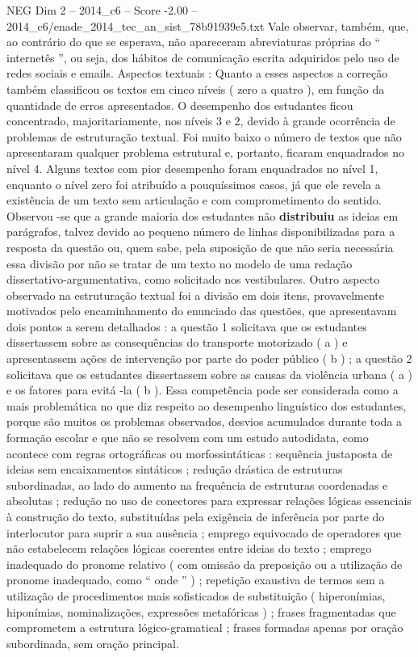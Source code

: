 \begin{textsample}{NEG Dim 2 – 2014\_c6 – Score -2.00 – 2014\_c6/enade\_2014\_tec\_an\_sist\_78b91939e5.txt}
Vale observar, também, que, ao contrário do que se esperava, não apareceram abreviaturas próprias do “ internetês ”, ou seja, dos hábitos de comunicação escrita adquiridos pelo uso de redes sociais e emails.
Aspectos textuais : Quanto a esses aspectos a correção também classificou os textos em cinco níveis ( zero a quatro ), em função da quantidade de erros apresentados.
O desempenho dos estudantes ficou concentrado, majoritariamente, nos níveis 3 e 2, devido à grande ocorrência de problemas de estruturação textual.
Foi muito baixo o número de textos que não apresentaram qualquer problema estrutural e, portanto, ficaram enquadrados no nível 4.
Alguns textos com pior desempenho foram enquadrados no nível 1, enquanto o nível zero foi atribuído a pouquíssimos casos, já que ele revela a existência de um texto sem articulação e com comprometimento do sentido.
Observou -se que a grande maioria dos estudantes não \textbf{distribuiu} as ideias em parágrafos, talvez devido ao pequeno número de linhas disponibilizadas para a resposta da questão ou, quem sabe, pela suposição de que não seria necessária essa divisão por não se tratar de um texto no modelo de uma redação dissertativo-argumentativa, como solicitado nos vestibulares.
Outro aspecto observado na estruturação textual foi a divisão em dois itens, provavelmente motivados pelo encaminhamento do enunciado das questões, que apresentavam dois pontos a serem detalhados : a questão 1 solicitava que os estudantes dissertassem sobre as consequências do transporte motorizado ( a ) e apresentassem ações de intervenção por parte do poder público ( b ) ; a questão 2 solicitava que os estudantes dissertassem sobre as causas da violência urbana ( a ) e os fatores para evitá -la ( b ).
Essa competência pode ser considerada como a mais problemática no que diz respeito ao desempenho linguístico dos estudantes, porque são muitos os problemas observados, desvios acumulados durante toda a formação escolar e que não se resolvem com um estudo autodidata, como acontece com regras ortográficas ou morfossintáticas : sequência justaposta de ideias sem encaixamentos sintáticos ; redução drástica de estruturas subordinadas, ao lado do aumento na frequência de estruturas coordenadas e absolutas ; redução no uso de conectores para expressar relações lógicas essenciais à construção do texto, substituídas pela exigência de inferência por parte do interlocutor para suprir a sua ausência ; emprego equivocado de operadores que não estabelecem relações lógicas coerentes entre ideias do texto ; emprego inadequado do pronome relativo ( com omissão da preposição ou a utilização de pronome inadequado, como “ onde ” ) ; repetição exaustiva de termos sem a utilização de procedimentos mais sofisticados de substituição ( hiperonímias, hiponímias, nominalizações, expressões metafóricas ) ; frases fragmentadas que comprometem a estrutura lógico-gramatical ; frases formadas apenas por oração subordinada, sem oração principal.

\end{textsample}
